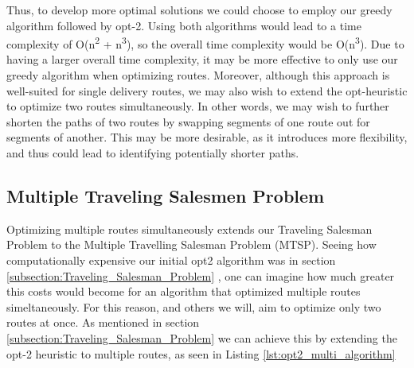 \documentclass[letterpaper]{article}
\begin{document}
\begin{figure}[h]
\begin{minipage}{0.3\linewidth}
        \end{minipage}
    \end{figure}

    Thus, to develop more optimal solutions we could choose to employ our 
    greedy algorithm followed by opt-2. Using both algorithms would lead to a time complexity of O(n\textsuperscript2 + n\textsuperscript3), so the overall time complexity would be O(n\textsuperscript3). Due to having a larger overall time complexity, it may be more effective to only use our greedy algorithm when optimizing routes. Moreover, although this approach is well-suited for single delivery routes, 
    we may also wish to extend the opt-heuristic to optimize two routes simultaneously. In other words, we may wish to further shorten the paths of two routes 
    by swapping segments of one route out for segments of another. This may be more 
    desirable, as it introduces more flexibility, and thus could lead to identifying 
    potentially shorter paths.



    \subsection{Multiple Traveling Salesmen Problem}
    \label{subsection:Multiple_Traveling_Salesmen_Problem}
    
    Optimizing multiple routes simultaneously extends our 
    Traveling Salesman Problem to the Multiple Travelling 
    Salesman Problem (MTSP). Seeing how computationally 
    expensive our initial opt2 algorithm was in section 
    \ref{subsection:Traveling_Salesman_Problem} , one can imagine how much greater 
    this costs would become for an algorithm that optimized 
    multiple routes simeltaneously. For this reason, and 
    others we will, aim to optimize only two routes at 
    once. As mentioned in section \ref{subsection:Traveling_Salesman_Problem} we can achieve this 
    by extending the opt-2 heuristic to multiple routes, as seen in Listing \ref{lst:opt2_multi_algorithm}
    \newpage
    
\end{document}
